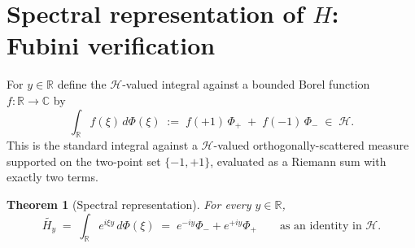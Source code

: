 \documentclass[11pt]{article}
\newtheorem{theorem}{Theorem}
\theoremstyle{definition}
\theoremstyle{remark}
\begin{document}
\section{Spectral representation of \texorpdfstring{$H$}{H}: Fubini verification}\label{sec:fubini}

For $y\in\mathbb{R}$ define the $\mathcal{H}$-valued integral against a bounded Borel function $f:\mathbb{R}\to\mathbb{C}$ by
\[
  \int_{\mathbb{R}} f(\xi)\,d\Phi(\xi)\;:=\;f(+1)\,\Phi_+\;+\;f(-1)\,\Phi_-\;\in\;\mathcal{H}.
\]
This is the standard integral against a $\mathcal{H}$-valued orthogonally-scattered measure supported on the two-point set $\{-1,+1\}$, evaluated as a Riemann sum with exactly two terms.

\begin{theorem}[Spectral representation]\label{thm:spectral}
For every $y\in\mathbb{R}$,
\[
  \widetilde{H_y}\;=\;\int_{\mathbb{R}} e^{i\xi y}\,d\Phi(\xi)\;=\;e^{-iy}\Phi_-+e^{+iy}\Phi_+\qquad\text{as an identity in $\mathcal{H}$.}
\]
\end{theorem}
\end{document}
